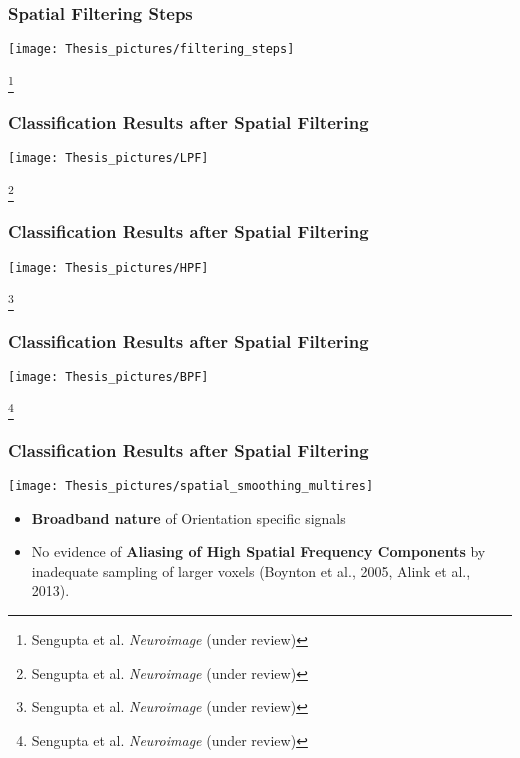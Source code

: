 \documentclass{beamer}
\newcommand\blfootnote[1]{%
  \begingroup
  \renewcommand\thefootnote{}\footnote{#1}%
  \addtocounter{footnote}{-1}%
  \endgroup
}
\begin{document}
   



  \begin{frame}
    \frametitle{Spatial Filtering Steps}
        \begin{center}
            \texttt{[image: Thesis\_pictures/filtering\_steps]}
        \end{center}
        \blfootnote{Sengupta et al. \textit{Neuroimage} (under review)}
    \end{frame} 

  \begin{frame}
    \frametitle{Classification Results after Spatial Filtering}
        \begin{center}
            \texttt{[image: Thesis\_pictures/LPF]}
        \end{center}
        \blfootnote{Sengupta et al. \textit{Neuroimage} (under review)}
    \end{frame} 

  \begin{frame}
    \frametitle{Classification Results after Spatial Filtering}
        \begin{center}
            \texttt{[image: Thesis\_pictures/HPF]}
        \end{center}
        \blfootnote{Sengupta et al. \textit{Neuroimage} (under review)}
    \end{frame} 

  \begin{frame}
    \frametitle{Classification Results after Spatial Filtering}
        \begin{center}
            \texttt{[image: Thesis\_pictures/BPF]}
        \end{center}
        \blfootnote{Sengupta et al. \textit{Neuroimage} (under review)}
    \end{frame} 


  \begin{frame}
    \frametitle{Classification Results after Spatial Filtering}
        \begin{center}
            \texttt{[image: Thesis\_pictures/spatial\_smoothing\_multires]}
        \end{center}
        \begin{itemize}
			\item \textbf{Broadband nature} of Orientation specific signals
			 \item No evidence of \textbf{Aliasing of High Spatial Frequency Components} by inadequate
			 sampling of larger voxels (Boynton et al., 2005, Alink et al., 2013).
        \end{itemize}
    \end{frame} 
\end{document}
